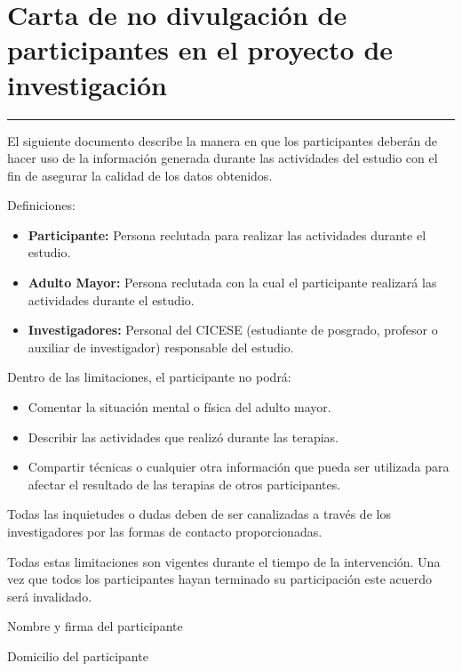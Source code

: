 \appendix{}

\chapter{Carta de no divulgaci\'on de participantes en el proyecto de investigaci\'on} \label{aped:B}
\vspace{-3ex}%
\noindent
\rule{\textwidth}{1pt}
\vspace{-2ex}%

El siguiente documento describe la manera en que los participantes deberán de hacer uso de la información generada durante las actividades del estudio con el fin de asegurar la calidad de los datos obtenidos.

Definiciones:
\begin{itemize}
	\item \textbf{Participante:} Persona reclutada para realizar las actividades durante el estudio.
	\item \textbf{Adulto Mayor:} Persona reclutada con la cual el participante realizará las actividades durante el estudio.
	\item \textbf{Investigadores:} Personal del CICESE (estudiante de posgrado, profesor o auxiliar de investigador) responsable del estudio.
\end{itemize}
Dentro de las limitaciones, el participante no podrá:
\begin{itemize}
	\item Comentar la situación mental o física del adulto mayor. 
	\item Describir las actividades que realizó durante las terapias. 
	\item Compartir técnicas o cualquier otra información que pueda ser utilizada para afectar el resultado de las terapias de otros participantes.
\end{itemize}

Todas las inquietudes o dudas deben de ser canalizadas a través de los investigadores por las formas de contacto proporcionadas.

Todas estas limitaciones son vigentes durante el tiempo de la intervención. Una vez que todos los participantes hayan terminado su participación este acuerdo será invalidado.

Nombre y firma del participante

Domicilio del participante
